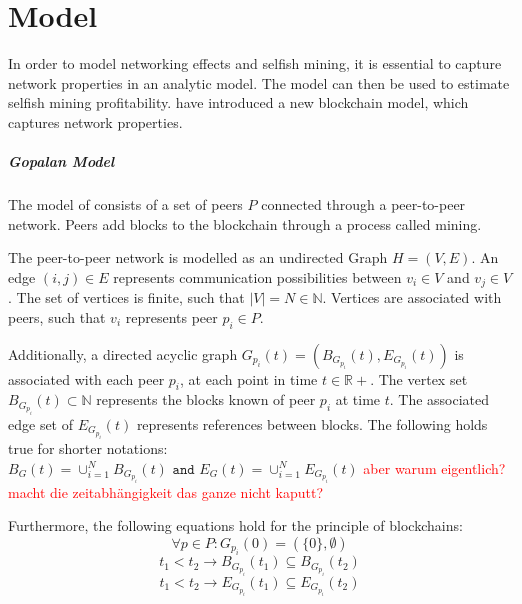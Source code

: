 \chapter{Model}\label{chap:model}
In order to model networking effects and selfish mining, it is essential to capture network properties in an analytic model. The model can then be used to estimate selfish mining profitability.
\citeauthor{gopalan} have introduced a new blockchain model, which captures network properties.

\paragraph{Gopalan Model}\label{gopalan}
The model of \citeauthor{gopalan} consists of a set of peers $P$ connected through a peer-to-peer network. Peers add blocks to the blockchain through a process called mining. 

The peer-to-peer network is modelled as an undirected Graph $H = (V,E)$.
An edge $(i,j) \in E$ represents communication possibilities between $v_i \in V$ and $v_j \in V$. 
The set of vertices is finite, such that $|V|=N \in \mathbb{N}$.
Vertices are associated with peers, such that $v_i$ represents peer $p_i \in P$.

Additionally, a directed acyclic graph $G_{p_i}(t) = (B_{G_{p_i}}(t),E_{G_{p_i}}(t))$ is associated with each peer $p_i$, at each point in time $t \in \mathbb{R+}$.
The vertex set $B_{G_{p_i}}(t) \subset \mathbb{N}$ represents the blocks known of peer $p_i$ at time $t$. The associated edge set of $E_{G_{p_i}}(t)$ represents references between blocks.
The following holds true for shorter notations:
$B_G(t) = \cup_{i=1}^N B_{G_{p_i}}(t) \texttt{ and } E_G(t) = \cup_{i=1}^N E_{G_{p_i}}(t)$
\textcolor{red}{aber warum eigentlich? macht die zeitabhängigkeit das ganze nicht kaputt?}

Furthermore, the following equations hold for the principle of blockchains:
\begin{equation}
\forall p \in P: G_{p_i}(0) = (\{0\},\emptyset)
\label{genesis}
\end{equation}
\begin{equation}
t_1 < t_2 \rightarrow B_{G_{p_i}}(t_1) \subseteq B_{G_{p_i}}(t_2)
\label{nodegrow}
\end{equation}
\begin{equation}
t_1 < t_2 \rightarrow E_{G_{p_i}}(t_1) \subseteq E_{G_{p_i}}(t_2)
\label{edgegrow}
\end{equation}

